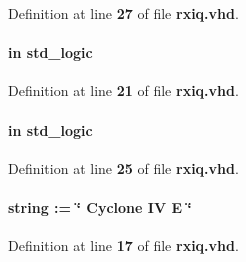Definition at line {\bf 27} of file {\bf rxiq.\+vhd}.

\paragraph[{clk}]{ {\bfseries \textcolor{keywordflow}{in}\textcolor{vhdlchar}{ }} {\bfseries \textcolor{comment}{std\+\_\+logic}\textcolor{vhdlchar}{ }} \hspace{0.3cm}{\ttfamily [Port]}}\label{classrxiq_a4a4609c199d30b3adebbeb3a01276ec5}


Definition at line {\bf 21} of file {\bf rxiq.\+vhd}.

\paragraph[{ddr\+\_\+en}]{ {\bfseries \textcolor{keywordflow}{in}\textcolor{vhdlchar}{ }} {\bfseries \textcolor{comment}{std\+\_\+logic}\textcolor{vhdlchar}{ }} \hspace{0.3cm}{\ttfamily [Port]}}\label{classrxiq_adbfe05e6692f69f8e592df06c6055f0a}


Definition at line {\bf 25} of file {\bf rxiq.\+vhd}.

\paragraph[{dev\+\_\+family}]{ {\bfseries \textcolor{vhdlchar}{ }} {\bfseries \textcolor{comment}{string}\textcolor{vhdlchar}{ }\textcolor{vhdlchar}{ }\textcolor{vhdlchar}{\+:}\textcolor{vhdlchar}{=}\textcolor{vhdlchar}{ }\textcolor{vhdlchar}{ }\textcolor{vhdlchar}{ }\textcolor{vhdlchar}{ }\textcolor{keyword}{\char`\"{} Cyclone I\+V E \char`\"{}}\textcolor{vhdlchar}{ }} \hspace{0.3cm}{\ttfamily [Generic]}}\label{classrxiq_a1314572919959082d23e5f98e64a0ce2}


Definition at line {\bf 17} of file {\bf rxiq.\+vhd}.

